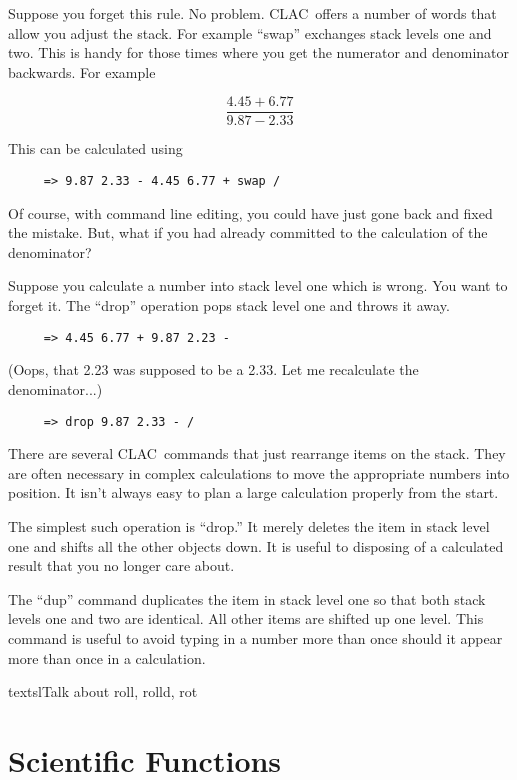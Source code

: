 \documentclass{report}
\newcommand{\CLAC}{CLAC}
\begin{document}
Suppose you forget this rule. No problem. \CLAC\ offers a number of words that allow you adjust the stack. For example ``swap'' exchanges stack levels one and two. This is handy for those times where you get the numerator and denominator backwards. For example

\begin{displaymath}
     \frac{ 4.45 + 6.77 }{ 9.87 - 2.33 }
\end{displaymath}

This can be calculated using

\begin{verbatim}
     => 9.87 2.33 - 4.45 6.77 + swap /
\end{verbatim}

Of course, with command line editing, you could have just gone back and fixed the mistake. But, what if you had already committed to the calculation of the denominator?

Suppose you calculate a number into stack level one which is wrong. You want to forget it. The ``drop'' operation pops stack level one and throws it away.

\begin{verbatim}
     => 4.45 6.77 + 9.87 2.23 -
\end{verbatim}

(Oops, that 2.23 was supposed to be a 2.33. Let me recalculate the denominator...)

\begin{verbatim}
     => drop 9.87 2.33 - /
\end{verbatim}

There are several \CLAC\ commands that just rearrange items on the stack. They are often necessary in complex calculations to move the appropriate numbers into position. It isn't always easy to plan a large calculation properly from the start.

The simplest such operation is ``drop.'' It merely deletes the item in stack level one and shifts all the other objects down. It is useful to disposing of a calculated result that you no longer care about.

The ``dup'' command duplicates the item in stack level one so that both stack levels one and two are identical. All other items are shifted up one level. This command is useful to avoid typing in a number more than once should it appear more than once in a calculation.

textsl{Talk about roll, rolld, rot}

\section{Scientific Functions}
\end{document}
